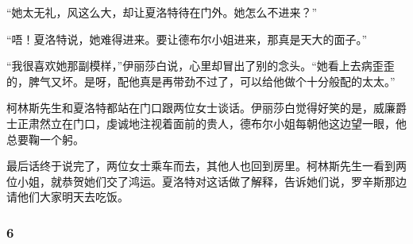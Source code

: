 \par “她太无礼，风这么大，却让夏洛特待在门外。她怎么不进来？”
\par “唔！夏洛特说，她难得进来。要让德布尔小姐进来，那真是天大的面子。”
\par “我很喜欢她那副模样，”伊丽莎白说，心里却冒出了别的念头。“她看上去病歪歪的，脾气又坏。是呀，配他真是再带劲不过了，可以给他做个十分般配的太太。”
\par 柯林斯先生和夏洛特都站在门口跟两位女士谈话。伊丽莎白觉得好笑的是，威廉爵士正肃然立在门口，虔诚地注视着面前的贵人，德布尔小姐每朝他这边望一眼，他总要鞠一个躬。
\par 最后话终于说完了，两位女士乘车而去，其他人也回到房里。柯林斯先生一看到两位小姐，就恭贺她们交了鸿运。夏洛特对这话做了解释，告诉她们说，罗辛斯那边请他们大家明天去吃饭。



\subsubsection*{6}


